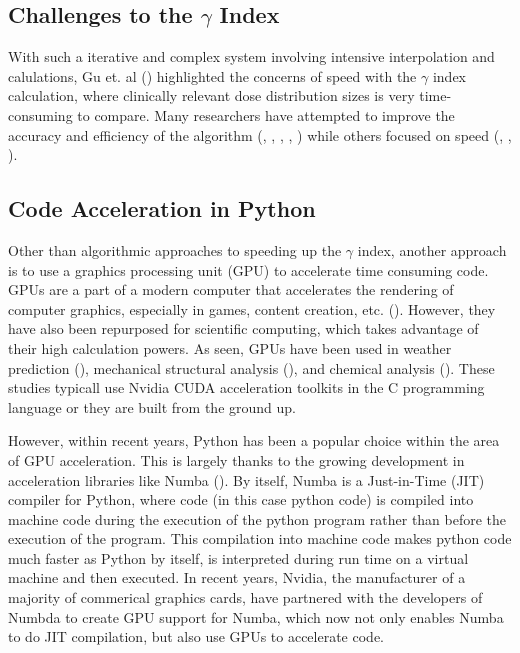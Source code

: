 \documentclass[12pt]{article}
\begin{document}
\subsection{Challenges to the $\gamma$ Index}
With such a iterative and complex system involving intensive interpolation and calulations, Gu et. al (\textcite{Gu}) highlighted the concerns of speed with the $\gamma$ index calculation, where clinically relevant dose distribution sizes is very time-consuming to compare. Many researchers have attempted to improve the accuracy and efficiency of the algorithm (\textcite{Bakai}, \textcite{Depuydt}, \textcite{Stock}, \textcite{Jiang}, \textcite{Spezi}) while others focused on speed (\textcite{Ju}, \textcite{Chen}, \textcite{Wendling}).

\subsection{Code Acceleration in Python}
Other than algorithmic approaches to speeding up the $\gamma$ index, another approach is to use a graphics processing unit (GPU) to accelerate time consuming code. GPUs are a part of a modern computer that accelerates the rendering of computer graphics, especially in games, content creation, etc. (\textcite{intel}). However, they have also been repurposed for scientific computing, which takes advantage of their high calculation powers. As seen, GPUs have been used in weather prediction (\textcite{Michalakes}), mechanical structural analysis (\textcite{Georgescu}), and chemical analysis (\textcite{Ma}). These studies typicall use Nvidia CUDA acceleration toolkits in the C programming language or they are built from the ground up.

However, within recent years, Python has been a popular choice within the area of GPU acceleration. This is largely thanks to the growing development in acceleration libraries like Numba (\textcite{Lam}). By itself, Numba is a Just-in-Time (JIT) compiler for Python, where code (in this case python code) is compiled into machine code during the execution of the python program rather than before the execution of the program. This compilation into machine code makes python code much faster as Python by itself, is interpreted during run time on a virtual machine and then executed. In recent years, Nvidia, the manufacturer of a majority of commerical graphics cards, have partnered with the developers of Numbda to create GPU support for Numba, which now not only enables Numba to do JIT compilation, but also use GPUs to accelerate code.
\end{document}
